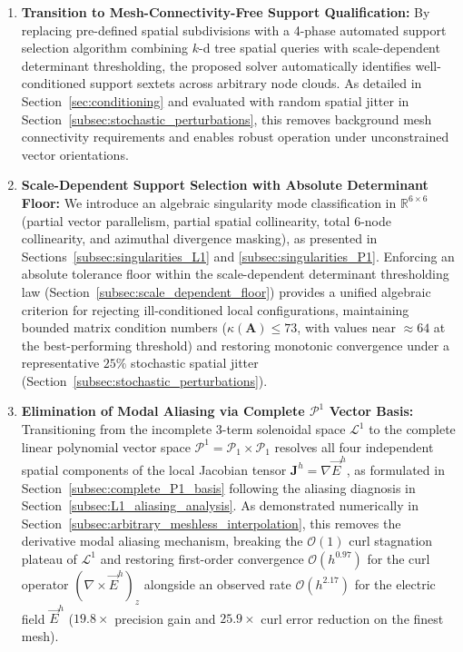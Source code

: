 \documentclass[preprint,12pt]{elsarticle}
\begin{document}
\begin{enumerate}
    \item \textbf{Transition to Mesh-Connectivity-Free Support Qualification:} By replacing pre-defined spatial subdivisions with a 4-phase automated support selection algorithm combining $k$-d tree spatial queries with scale-dependent determinant thresholding, the proposed solver automatically identifies well-conditioned support sextets across arbitrary node clouds. As detailed in Section~\ref{sec:conditioning} and evaluated with random spatial jitter in Section~\ref{subsec:stochastic_perturbations}, this removes background mesh connectivity requirements and enables robust operation under unconstrained vector orientations.
    
    \item \textbf{Scale-Dependent Support Selection with Absolute Determinant Floor:} We introduce an algebraic singularity mode classification in $\mathbb{R}^{6\times6}$ (partial vector parallelism, partial spatial collinearity, total 6-node collinearity, and azimuthal divergence masking), as presented in Sections~\ref{subsec:singularities_L1} and \ref{subsec:singularities_P1}. Enforcing an absolute tolerance floor within the scale-dependent determinant thresholding law (Section~\ref{subsec:scale_dependent_floor}) provides a unified algebraic criterion for rejecting ill-conditioned local configurations, maintaining bounded matrix condition numbers ($\kappa(\mathbf{A}) \le 73$, with values near $\approx 64$ at the best-performing threshold) and restoring monotonic convergence under a representative $25\%$ stochastic spatial jitter (Section~\ref{subsec:stochastic_perturbations}).
    
    \item \textbf{Elimination of Modal Aliasing via Complete $\mathcal{P}^1$ Vector Basis:} Transitioning from the incomplete 3-term solenoidal space $\mathcal{L}^1$ to the complete linear polynomial vector space $\mathcal{P}^1 = \mathcal{P}_1 \times \mathcal{P}_1$ resolves all four independent spatial components of the local Jacobian tensor $\mathbf{J}^h = \nabla \vec{E}^h$, as formulated in Section~\ref{subsec:complete_P1_basis} following the aliasing diagnosis in Section~\ref{subsec:L1_aliasing_analysis}. As demonstrated numerically in Section~\ref{subsec:arbitrary_meshless_interpolation}, this removes the derivative modal aliasing mechanism, breaking the $\mathcal{O}(1)$ curl stagnation plateau of $\mathcal{L}^1$ and restoring first-order convergence $\mathcal{O}(h^{0.97})$ for the curl operator $(\nabla \times \vec{E}^h)_z$ alongside an observed rate $\mathcal{O}(h^{2.17})$ for the electric field $\vec{E}^h$ ($19.8\times$ precision gain and $25.9\times$ curl error reduction on the finest mesh).
    

\end{enumerate}
\end{document}
